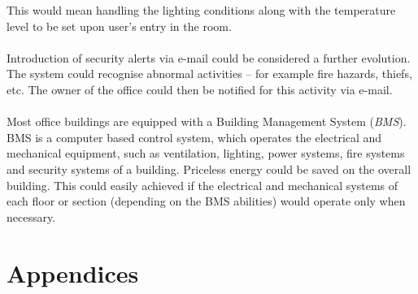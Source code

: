 \documentclass[12pt,a4paper,draft]{report}
\begin{document}
This would mean handling the lighting conditions along with the temperature level to be set upon user's entry in the room. \\
\ \\
Introduction of security alerts via e-mail could be considered a further evolution.
The system could recognise abnormal activities -- for example fire hazards, thiefs, etc.
The owner of the office could then be notified for this activity via e-mail.\\
\ \\
Most office buildings are equipped with a Building Management System (\textit{BMS}).
BMS is a computer based control system, which  operates the electrical and mechanical equipment, such as ventilation, lighting, power systems, fire systems and security systems of a building.
Priceless energy could be saved on the overall building.
This could easily achieved if the electrical and mechanical systems of each floor or section (depending on the BMS abilities) would operate only when necessary.
%
\newpage
%


%
\newpage
%
\chapter*{Appendices}
%
\end{document}
